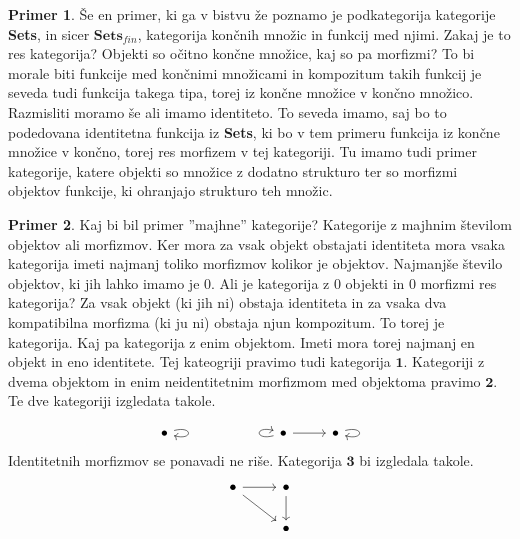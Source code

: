 \documentclass[12pt,a4paper]{book}
\theoremstyle{definition}
\theoremstyle{plain}
\theoremstyle{definition}
\newtheorem{primer}{Primer}[section]
\theoremstyle{remark}
\newcommand{\cat}[1]{\textbf{#1}}
\begin{document}
\begin{primer}
Še en primer, ki ga v bistvu že poznamo je podkategorija kategorije \cat{Sets}, in sicer $\cat{Sets}_{fin}$, kategorija končnih množic in funkcij med njimi. Zakaj je to res kategorija? Objekti so očitno končne množice, kaj so pa morfizmi? 
To bi morale biti funkcije med končnimi množicami in kompozitum takih funkcij je seveda tudi funkcija takega tipa, torej iz končne množice v končno množico. Razmisliti moramo še ali imamo identiteto. To seveda imamo, saj bo to podedovana identitetna funkcija iz \cat{Sets}, ki bo v tem primeru funkcija iz končne množice v končno, torej res morfizem v tej kategoriji. Tu imamo tudi primer kategorije, katere objekti so množice z dodatno strukturo ter so morfizmi objektov funkcije, ki ohranjajo strukturo teh množic.
\end{primer}

\begin{primer}
Kaj bi bil primer ''majhne'' kategorije? Kategorije z majhnim številom objektov ali morfizmov. Ker mora za vsak objekt obstajati identiteta mora vsaka kategorija imeti najmanj toliko morfizmov kolikor je objektov. Najmanjše število objektov, ki jih lahko imamo je 0. Ali je kategorija z 0 objekti in 0 morfizmi res kategorija? Za vsak objekt (ki jih ni) obstaja identiteta in za vsaka dva kompatibilna morfizma (ki ju ni) obstaja njun kompozitum. To torej je kategorija. Kaj pa kategorija z enim objektom. Imeti mora torej najmanj en objekt in eno identitete. Tej kateogriji pravimo tudi kategorija $\mathbf{1}$. Kategoriji z dvema objektom in enim neidentitetnim morfizmom med objektoma pravimo $\mathbf{2}$. Te dve kategoriji izgledata takole.

\begin{equation}
\begin{tikzcd}
\bullet \arrow[loop right] &&&  \arrow[loop left] \bullet \arrow[r] & \bullet \arrow[loop right]
\end{tikzcd}
\end{equation}
%
Identitetnih morfizmov se ponavadi ne riše. Kategorija $\cat{3}$ bi izgledala takole.
%
\begin{equation}
\begin{tikzcd}
\bullet \arrow[r] \arrow[rd] & \bullet \arrow[d] \\
& \bullet
\end{tikzcd}
\end{equation}
\end{primer}
\end{document}

